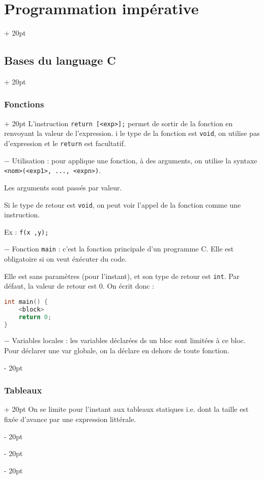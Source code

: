 \documentclass[a4paper, 12pt, twoside]{article}
\newcommand{\ind}[1][20pt]{\advance\leftskip + #1}
\newcommand{\deind}[1][20pt]{\advance\leftskip - #1}
\newenvironment{indentedenv}[1][20pt]{\par \ind[#1]}{\par \deind}
\newenvironment{indt}[2][20pt]{#2 \begin{indentedenv}[#1]}{\end{indentedenv}} %
\begin{document}
\begin{indt}{\section{Programmation impérative}}
\begin{indt}{\subsection{Bases du language C}}
\begin{indt}{\subsubsection{Fonctions}}
                L'instruction \texttt{return [<exp>];} permet de sortir de la fonction en renvoyant la valeur de l'expression. i le type de la fonction est \texttt{void}, on utilise pas d'expression et le \texttt{return} est facultatif.
                
                \vspace{12pt}
                
                $-$ Utilisation : pour applique une fonction, à des arguments, on utilise la syntaxe \texttt{<nom>(<exp1>, ..., <expn>)}.
                
                Les arguments sont passés par valeur.
                
                Si le type de retour est \texttt{void}, on peut voir l'appel de la fonction comme une instruction.
                
                Ex : \texttt{f(x ,y);}
                
                \vspace{12pt}
                
                $-$ Fonction \texttt{main} : c'est la fonction principale d'un programme C. Elle est obligatoire si on veut éxécuter du code.
                
                Elle est sans paramètres (pour l'instant), et son type de retour est \texttt{int}. Par défaut, la valeur de retour est $0$. On écrit donc :
                    
                \begin{lstlisting}[language=C, xleftmargin=80pt]
int main() {
    <block>
    return 0;
}
                \end{lstlisting}
                
                \vspace{12pt}
                
                $-$ Variables locales : les variables déclarées ds un bloc sont limitées à ce bloc.
                Pour déclarer une var globale, on la déclare en dehors de toute fonction.
            \end{indt}
            
            \vspace{12pt}
            
            \begin{indt}{\subsubsection{Tableaux}}
                On se limite pour l'instant aux tableaux statiques i.e. dont la taille est fixée d'avance par une expression littérale.
                

\end{indt}
\end{indt}
\end{indt}
\end{document}
